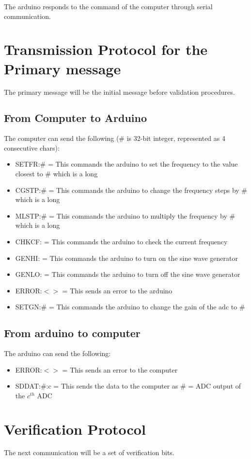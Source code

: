 \documentclass [a4paper,11pt]{article}
\begin{document}
The arduino responds to the command of the computer through serial communication.
\section{Transmission Protocol for the Primary message}
The primary message will be the initial message before validation procedures.
\subsection{From Computer to Arduino}
The computer can send the following (\# is 32-bit integer, represented as 4 consecutive chars):
\begin{itemize}
\item SETFR:\# = This commands the arduino to set the frequency to the value closest to \# which is a long
\item CGSTP:\# = This commands the arduino to change the frequency steps by \# which is a long
\item MLSTP:\# = This commands the arduino to multiply the frequency by \# which is a long
\item CHKCF: = This commands the arduino to check the current frequency
\item GENHI: = This commands the arduino to turn on the sine wave generator
\item GENLO: = This commands the arduino to turn off the sine wave generator
\item ERROR:$<>$ = This sends an error to the arduino
\item SETGN:\# = This commands the arduino to change the gain of the adc to \#
\end{itemize}
\subsection{From arduino to computer}
The arduino can send the following:
\begin{itemize}
\item ERROR:$<>$ = This sends an error to the computer
\item SDDAT:\#:c =  This sends the data to the computer as \# = ADC output of the $c^{th}$ ADC
\end{itemize}
\section{Verification Protocol}
The next communication will be a set of verification bits.
\end{document}
